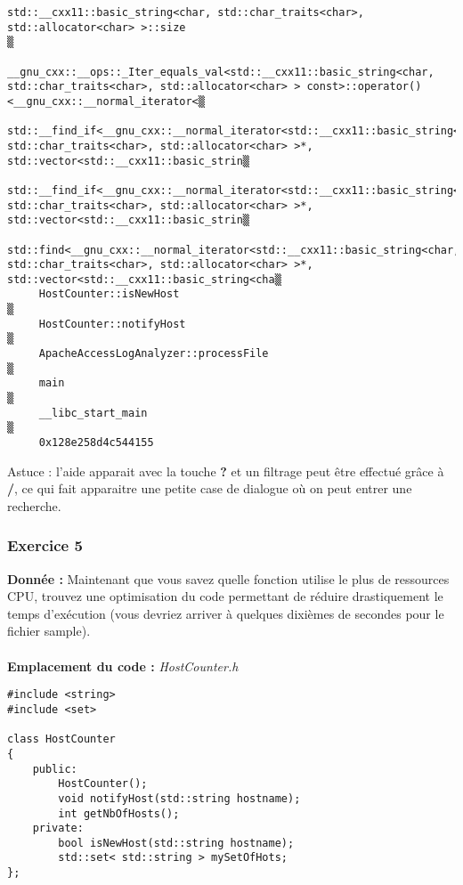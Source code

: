 \begin{lstlisting}
std::__cxx11::basic_string<char, std::char_traits<char>, std::allocator<char> >::size                                                                              ▒
     __gnu_cxx::__ops::_Iter_equals_val<std::__cxx11::basic_string<char, std::char_traits<char>, std::allocator<char> > const>::operator()<__gnu_cxx::__normal_iterator<▒
     std::__find_if<__gnu_cxx::__normal_iterator<std::__cxx11::basic_string<char, std::char_traits<char>, std::allocator<char> >*, std::vector<std::__cxx11::basic_strin▒
     std::__find_if<__gnu_cxx::__normal_iterator<std::__cxx11::basic_string<char, std::char_traits<char>, std::allocator<char> >*, std::vector<std::__cxx11::basic_strin▒
     std::find<__gnu_cxx::__normal_iterator<std::__cxx11::basic_string<char, std::char_traits<char>, std::allocator<char> >*, std::vector<std::__cxx11::basic_string<cha▒
     HostCounter::isNewHost                                                                                                                                             ▒
     HostCounter::notifyHost                                                                                                                                            ▒
     ApacheAccessLogAnalyzer::processFile                                                                                                                               ▒
     main                                                                                                                                                               ▒
     __libc_start_main                                                                                                                                                  ▒
     0x128e258d4c544155 
\end{lstlisting}
Astuce : l'aide apparait avec la touche \textbf{?} et un filtrage peut être effectué grâce à \textbf{/}, ce qui fait apparaitre une petite case de dialogue où on peut entrer une recherche.

\subsubsection{Exercice 5}
\textbf{Donnée : } Maintenant	que	vous	savez	quelle	fonction	utilise	le	plus	de	ressources	CPU,	trouvez	une	optimisation	
du	code	permettant	de	réduire	drastiquement	le	temps	d'exécution	(vous	devriez	arriver	à	quelques	
dixièmes	de	secondes	pour	le	fichier	sample).\\\\
\textbf{Emplacement du code : } \textit{HostCounter.h}
\begin{lstlisting}
#include <string>
#include <set>

class HostCounter
{
    public:
        HostCounter();
        void notifyHost(std::string hostname);
        int getNbOfHosts();
    private:
        bool isNewHost(std::string hostname);
        std::set< std::string > mySetOfHots;
};
\end{lstlisting}

